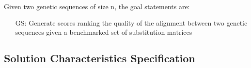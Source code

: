 \documentclass[12pt]{article}
\newcounter{goalnum} %
\begin{document}
\noindent Given two genetic sequences of size n, the goal statements are:

\begin{itemize}

\item[GS\refstepcounter{goalnum}\thegoalnum \label{generate_alignment}:] Generate 
scores ranking the quality of the alignment between two genetic sequences given a 
benchmarked set of substitution matrices

\end{itemize}

\subsection{Solution Characteristics Specification}



\end{document}
